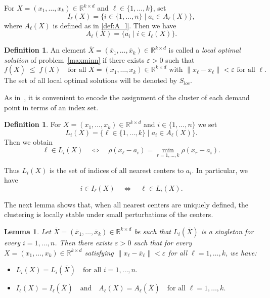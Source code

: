 \documentclass[11pt]{article}
\newtheorem{lemma}[theorem]{Lemma}
\theoremstyle{definition}
\newtheorem{definition}[theorem]{Definition}
\newcommand{\R}{\mathbb{R}}
\newcommand{\1}{\mathbf{1}}
\def\Bar{\overline}
\begin{document}
For $X=(x_1,\dots,x_k)\in\R^{k\times d}$ and $\ell\in\{1,\dots,k\}$, set
\[
I_\ell(X)=
\{i\in\{1,\dots,n\}\mid a_i\in A_\ell(X)\},
\]
where $A_\ell(X)$ is defined as in \eqref{def:A_l}.
Then we have $$A_\ell(X)=\{a_i\mid i\in I_\ell(X)\}.$$

\begin{definition}\label{deflocal}
An element $\Bar X=(\bar x_1,\dots,\bar x_k)\in\R^{k\times d}$ is called a
\emph{local optimal solution} of problem~\eqref{maxminn} if there exists
$\varepsilon>0$ such that
\[
f(\Bar X)\;\le\;f(X)
\quad
\text{for all }X=(x_1,\dots,x_k)\in\R^{k\times d}
\text{ with }\|x_\ell-\bar x_\ell\|<\varepsilon
\text{ for all }\ell.
\]
The set of all local optimal solutions will be denoted by $S_{loc}$.
\end{definition}

As in~\cite{LNTV}, it is convenient to encode the assignment of the cluster of each demand point in terms of an index set.

\begin{definition}\label{def2}
For $X=(x_1,\dots,x_k)\in\R^{k\times d}$ and $i\in\{1,\dots,n\}$ we set
\[
L_i(X)=\bigl\{\ell\in\{1,\dots,k\}\mid a_i\in A_\ell(X)\bigr\}.
\]
Then we obtain
\[
\ell\in L_i(X)
\quad\Longleftrightarrow\quad
\rho(x_\ell-a_i)
=
\min_{r=1,\dots,k}\rho(x_r-a_i).
\]
\end{definition}
Thus $L_i(X)$ is the set of indices of all nearest centers to $a_i$. In particular, we have
\begin{equation}\label{indexI}
i\in I_\ell(X)
\quad\Longleftrightarrow\quad
\ell\in L_i(X).    
\end{equation}

The next lemma shows that, when all nearest centers are uniquely defined, the clustering is locally stable under small perturbations of the centers.

\begin{lemma}\label{lem:Li-stable}
Let $\Bar X=(\bar x_1,\dots,\bar x_k)\in\R^{k\times d}$ be such that
$L_i(\Bar X)$ is a singleton for every $i=1,\dots,n$. Then there exists
$\varepsilon>0$ such that for every
$X=(x_1,\dots,x_k)\in\R^{k\times d}$ satisfying
$\|x_\ell-\bar x_\ell\|<\varepsilon$ for all $\ell=1,\dots,k$, we have:
\begin{itemize}
    \item [\rm{(a)}] $L_i(X) = L_i(\Bar X)\quad\text{for all } i=1,\dots,n.$
    \item [\rm{(b)}] 
$I_\ell(X) = I_\ell(\Bar X)\quad\text{and}\quad A_\ell(X)=A_\ell(\Bar X)
\quad\text{for all } \ell=1,\dots,k.$
\end{itemize}
\end{lemma}
\end{document}
